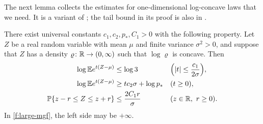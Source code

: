 The next lemma collects the estimates for one-dimensional log-concave laws that we need. It is a variant of \cite[Lemma~7.7]{oai-fluctuations}; the tail bound in its proof is also in \cite[Proposition~5.1, proof, Step~3]{quantitative-parisi}.

\begin{lemma}\label{f:one-dim}
There exist universal constants $c_1,c_2,p_*,C_1>0$ with the following property. Let $Z$ be a real random variable with mean $\mu$ and finite variance $\sigma^2>0$, and suppose that $Z$ has a density $\varrho\colon\mathbb R\to(0,\infty)$ such that $\log\varrho$ is concave. Then
\begin{align}
 \log\E e^{t(Z-\mu)}&\le\log3 &&\Bigl(|t|\le\frac{c_1}{2\sigma}\Bigr),\label{f:small-mgf}\\
 \log\E e^{t(Z-\mu)}&\ge tc_2\sigma+\log p_* &&(t\ge0),\label{f:large-mgf}\\
 \PP\{z-r\le Z\le z+r\}&\le\frac{2C_1r}{\sigma} &&(z\in\R,\ r\ge0).\label{f:interval}
\end{align}
In \eqref{f:large-mgf}, the left side may be $+\infty$.
\end{lemma}

